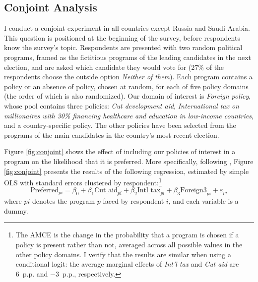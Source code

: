 \documentclass[12pt,english]{article}
\begin{document}
\begin{bibunit}
\subsection{Conjoint Analysis}\label{subsec:conjoint}

I conduct a conjoint experiment in all countries except Russia and Saudi Arabia. This question is positioned at the beginning of the survey, before respondents know the survey's topic. Respondents are presented with two random political programs, framed as the fictitious programs of the leading candidates in the next election, and are asked which candidate they would vote for (27\% of the respondents choose the outside option \textit{Neither of them}). Each program contains a policy or an absence of policy, chosen at random, for each of five policy domains (the order of which is also randomized). Our domain of interest is \textit{Foreign policy}, whose pool contains three policies: \textit{Cut development aid}, \textit{International tax on millionaires with 30\% financing healthcare and education in low-income countries}, and a country-specific policy. The other policies have been selected from the programs of the main candidates in the country's most recent election.

Figure \ref{fig:conjoint} shows the effect of including our policies of interest in a program on the likelihood that it is preferred. %
More specifically, following \cite{hainmueller_causal_2014}, Figure \ref{fig:conjoint} %
presents 
the results %
of the following regression, estimated by simple OLS with standard errors clustered by respondent:\footnote{The AMCE is the change in the probability that a program is chosen if a policy is present rather than not, averaged across all possible values in the other policy domains. I verify that the results are similar when using a conditional logit: the average marginal effects of \textit{Int'l tax} and \textit{Cut aid} are 6~p.p. and $-$3~p.p., respectively.}
\begin{equation}\label{eq:conjoint}
\text{Preferred}_{pi} = \beta_0 + \beta_1 \text{Cut\_aid}_{pi} + \beta_2 \text{Intl\_tax}_{pi} + \beta_3 \text{Foreign3}_{pi} + \varepsilon_{pi}
\end{equation}
where $pi$ denotes the program $p$ faced by respondent $i$, and each variable is a dummy.


\end{bibunit}
\end{document}
